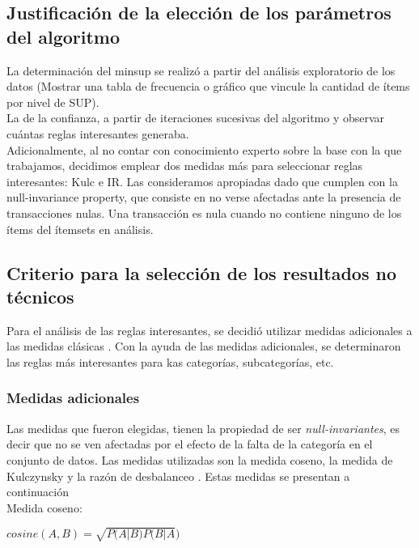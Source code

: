 \documentclass[]{article}
\begin{document}
\subsection{Justificación de la elección de los parámetros del algoritmo}
La determinación del minsup se realizó a partir del análisis exploratorio de los datos (Mostrar una tabla de frecuencia o gráfico que vincule la cantidad de ítems por nivel de SUP).\\

La de la confianza, a partir de iteraciones sucesivas del algoritmo y observar cuántas reglas interesantes generaba.\\

Adicionalmente, al no contar con conocimiento experto sobre la base con la que trabajamos, decidimos emplear dos medidas más para seleccionar reglas interesantes: Kulc e IR. Las consideramos apropiadas dado que cumplen con la null-invariance property, que consiste en no verse afectadas ante la presencia de transacciones nulas. Una transacción es nula cuando no contiene ninguno de los ítems del ítemsets en análisis.

\subsection{Criterio para la selección de los resultados no técnicos}

Para el análisis de las reglas interesantes, se decidió utilizar medidas adicionales a las medidas clásicas \cite{Tan:2005:IDM:1095618}. Con la ayuda de las medidas adicionales, se determinaron las reglas más interesantes para kas categorías, subcategorías, etc. 

\subsubsection{Medidas adicionales}
Las medidas que fueron elegidas, tienen la propiedad de ser \textit{null-invariantes}, es decir que no se ven afectadas por el efecto de la falta de la categoría en el conjunto de datos. Las medidas utilizadas son la medida coseno, la medida de Kulczynsky y la razón de desbalanceo \cite{Hall:2009:WDM:1656274.1656278}. Estas medidas se presentan a continuación\\

Medida coseno:

\begin{center}
	$cosine(A,B) = \sqrt{P(A|B) P(B|A})$
\end{center}
	
\end{document}
